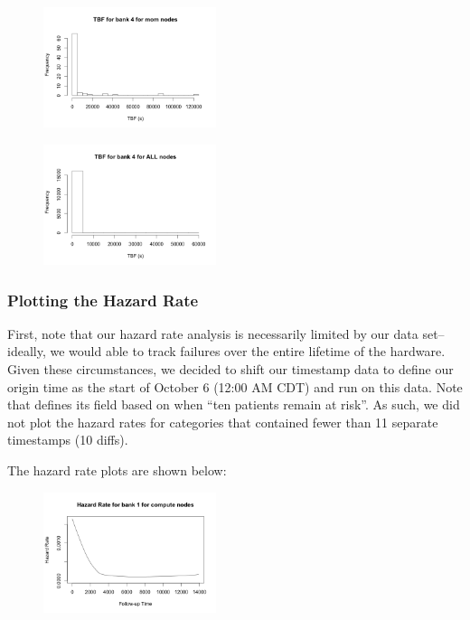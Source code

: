 \begin{figure}
\centering
\includegraphics[width=0.45\textwidth]{images/tbf_4_m.png}
\end{figure}

\begin{figure}
\centering
\includegraphics[width=0.45\textwidth]{images/tbf_4_a.png}
\end{figure}

\subsubsection{Plotting the Hazard Rate}

First, note that our hazard rate analysis is necessarily limited by our data set--ideally, we would able to track failures over the entire lifetime of the hardware.  Given these circumstances, we decided to shift our timestamp data to define our origin time as the start of October 6 (12:00 AM CDT) and run  on this data.  Note that  defines its  field based on when ``ten patients remain at risk''.  As such, we did not plot the hazard rates for categories that contained fewer than 11 separate timestamps (10 diffs).

The hazard rate plots are shown below:

\begin{figure}
\centering
\includegraphics[width=0.45\textwidth]{images/haz_1_c.png}
\end{figure}

